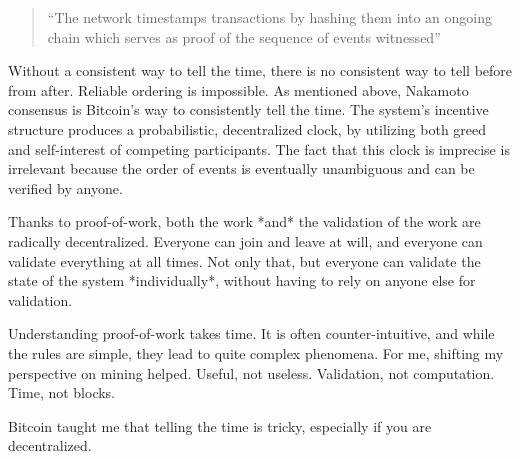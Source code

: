 \begin{quotation}
``The network timestamps transactions by hashing them into an ongoing
chain which serves as proof of the sequence of events witnessed''
\end{quotation}

Without a consistent way to tell the time, there is no consistent way to
tell before from after. Reliable ordering is impossible. As mentioned
above, Nakamoto consensus is Bitcoin's way to consistently tell the
time. The system's incentive structure produces a probabilistic,
decentralized clock, by utilizing both greed and self-interest of
competing participants. The fact that this clock is imprecise is
irrelevant because the order of events is eventually unambiguous and can
be verified by anyone.

Thanks to proof-of-work, both the work *and* the validation of the work
are radically decentralized. Everyone can join and leave at will, and
everyone can validate everything at all times. Not only that, but
everyone can validate the state of the system *individually*, without
having to rely on anyone else for validation.

Understanding proof-of-work takes time. It is often counter-intuitive,
and while the rules are simple, they lead to quite complex phenomena.
For me, shifting my perspective on mining helped. Useful, not useless.
Validation, not computation. Time, not blocks.

Bitcoin taught me that telling the time is tricky, especially if you are
decentralized.

%
%
%
%
%
%
%
